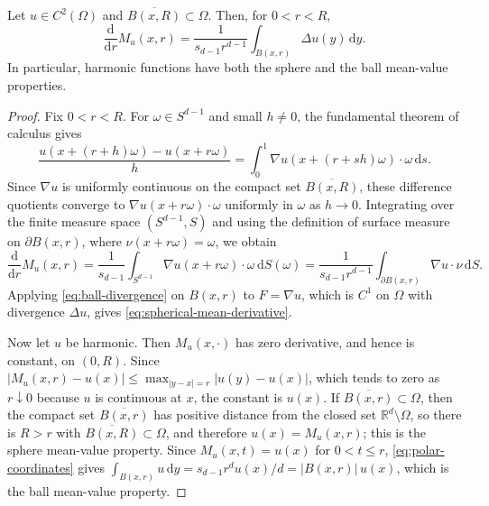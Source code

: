 \begin{proposition}\label{prop:spherical-mean-derivative}
Let $u\in C^2(\Omega)$ and $\overline{B(x,R)}\subset\Omega$. Then, for $0<r<R$,
\begin{equation}\label{eq:spherical-mean-derivative}
 \frac{\mathrm d}{\mathrm d r}M_u(x,r)
 =\frac{1}{s_{d-1}r^{d-1}}\int_{B(x,r)}\Delta u(y)\,\mathrm d y.
\end{equation}
In particular, harmonic functions have both the sphere and the ball mean-value properties.
\end{proposition}
\begin{proof}
Fix $0<r<R$. For $\omega\in S^{d-1}$ and small $h\neq0$, the fundamental theorem of calculus gives
\[
 \frac{u(x+(r+h)\omega)-u(x+r\omega)}{h}=\int_0^1\nabla u(x+(r+sh)\omega)\cdot\omega\,\mathrm ds.
\]
Since $\nabla u$ is uniformly continuous on the compact set $\overline{B(x,R)}$, these difference quotients converge to $\nabla u(x+r\omega)\cdot\omega$ uniformly in $\omega$ as $h\to0$. Integrating over the finite measure space $(S^{d-1},S)$ and using the definition of surface measure on $\partial B(x,r)$, where $\nu(x+r\omega)=\omega$, we obtain
\[
 \frac{\mathrm d}{\mathrm d r}M_u(x,r)=\frac{1}{s_{d-1}}\int_{S^{d-1}}\nabla u(x+r\omega)\cdot\omega\,\mathrm dS(\omega)=\frac{1}{s_{d-1}r^{d-1}}\int_{\partial B(x,r)}\nabla u\cdot\nu\,\mathrm dS.
\]
Applying \eqref{eq:ball-divergence} on $B(x,r)$ to $F=\nabla u$, which is $C^1$ on $\Omega$ with divergence $\Delta u$, gives \eqref{eq:spherical-mean-derivative}.

Now let $u$ be harmonic. Then $M_u(x,\cdot)$ has zero derivative, and hence is constant, on $(0,R)$. Since $|M_u(x,r)-u(x)|\leq\max_{|y-x|=r}|u(y)-u(x)|$, which tends to zero as $r\downarrow0$ because $u$ is continuous at $x$, the constant is $u(x)$. If $\overline{B(x,r)}\subset\Omega$, then the compact set $\overline{B(x,r)}$ has positive distance from the closed set $\mathbb R^d\setminus\Omega$, so there is $R>r$ with $\overline{B(x,R)}\subset\Omega$, and therefore $u(x)=M_u(x,r)$; this is the sphere mean-value property. Since $M_u(x,t)=u(x)$ for $0<t\leq r$, \eqref{eq:polar-coordinates} gives $\int_{B(x,r)}u\,\mathrm dy=s_{d-1}r^du(x)/d=|B(x,r)|\,u(x)$, which is the ball mean-value property.
\end{proof}

